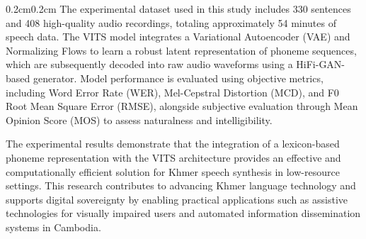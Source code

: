 \begin{adjustwidth}{0.2cm}{0.2cm}
    The experimental dataset used in this study includes 330 sentences and 
    408 high-quality audio recordings, totaling approximately 54 minutes 
    of speech data. The VITS model integrates a Variational Autoencoder 
    (VAE) and Normalizing Flows to learn a robust latent representation 
    of phoneme sequences, which are subsequently decoded into raw audio 
    waveforms using a HiFi-GAN-based generator. Model performance is 
    evaluated using objective metrics, including Word Error Rate (WER), 
    Mel-Cepstral Distortion (MCD), and F0 Root Mean Square Error (RMSE), 
    alongside subjective evaluation through Mean Opinion Score (MOS) 
    to assess naturalness and intelligibility.
    
    The experimental results demonstrate that the integration of a 
    lexicon-based phoneme representation with the VITS architecture 
    provides an effective and computationally efficient solution for 
    Khmer speech synthesis in low-resource settings. This research 
    contributes to advancing Khmer language technology and supports 
    digital sovereignty by enabling practical applications such as 
    assistive technologies for visually impaired users and automated 
    information dissemination systems in Cambodia.

    
    \end{adjustwidth}